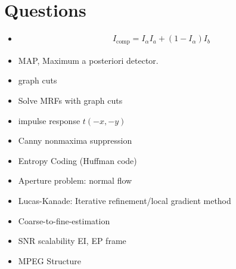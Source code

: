 \newpage
\chapter{Questions}
\begin{itemize}[leftmargin=2em]
	\item 
	\begin{gather*}
		I_{\text{comp}}=I_{\alpha}I_{a}+\left( 1-I_{\alpha} \right)I_b
	\end{gather*}
	\item MAP, Maximum a posteriori detector.
	\item graph cuts
	\item Solve MRFs with graph cuts
	\item impulse response $t(-x,-y)$
	\item Canny nonmaxima suppression
	\item Entropy Coding (Huffman code)
	\item Aperture problem: normal flow
	\item Lucas-Kanade: Iterative refinement/local gradient method
	\item Coarse-to-fine-estimation
	\item SNR scalability EI, EP frame
	\item MPEG Structure
\end{itemize}
\vfill
